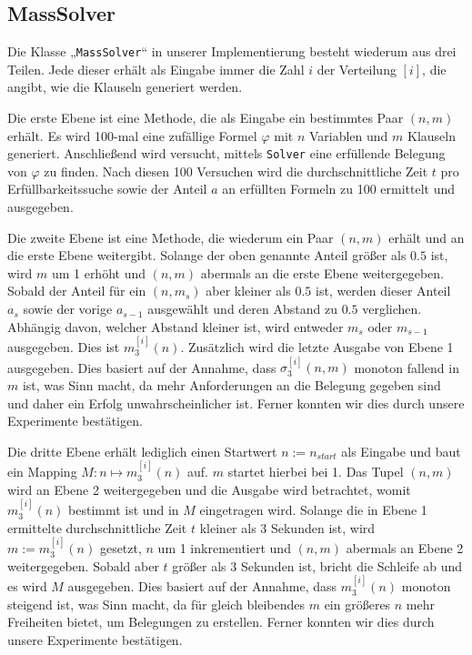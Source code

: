 \documentclass[maincolor=black]{exercise}
\newcommand{\anf}[1]{„#1“}
\begin{document}
\subsection{MassSolver}
Die Klasse \anf{\texttt{MassSolver}} in unserer Implementierung besteht wiederum aus drei Teilen. Jede dieser erhält als Eingabe immer die Zahl $i$ der Verteilung $[i]$, die angibt, wie die Klauseln generiert werden.\par
Die erste Ebene ist eine Methode, die als Eingabe ein bestimmtes Paar $(n,m)$ erhält. Es wird 100-mal eine zufällige Formel $\varphi$ mit $n$ Variablen und $m$ Klauseln generiert. Anschließend wird versucht, mittels \texttt{Solver} eine erfüllende Belegung von $\varphi$ zu finden. Nach diesen 100 Versuchen wird die durchschnittliche Zeit $t$ pro Erfüllbarkeitssuche sowie der Anteil $a$ an erfüllten Formeln zu 100 ermittelt und ausgegeben.\par
Die zweite Ebene ist eine Methode, die wiederum ein Paar $(n,m)$ erhält und an die erste Ebene weitergibt. Solange der oben genannte Anteil größer als $0.5$ ist, wird $m$ um 1 erhöht und $(n,m)$ abermals an die erste Ebene weitergegeben. Sobald der Anteil für ein $(n,m_s)$ aber kleiner als $0.5$ ist, werden dieser Anteil $a_s$ sowie der vorige $a_{s-1}$ ausgewählt und deren Abstand zu $0.5$ verglichen. Abhängig davon, welcher Abstand kleiner ist, wird entweder $m_s$ oder $m_{s-1}$ ausgegeben. Dies ist $m_3^{[i]}(n)$. Zusätzlich wird die letzte Ausgabe von Ebene 1 ausgegeben. Dies basiert auf der Annahme, dass $\sigma_3^{[i]}(n,m)$ monoton fallend in $m$ ist, was Sinn macht, da mehr Anforderungen an die Belegung gegeben sind und daher ein Erfolg unwahrscheinlicher ist. Ferner konnten wir dies durch unsere Experimente bestätigen.\par
Die dritte Ebene erhält lediglich einen Startwert $n := n_{start}$ als Eingabe und baut ein Mapping $M: n \mapsto m_3^{[i]}(n)$ auf. $m$ startet hierbei bei 1. Das Tupel $(n,m)$ wird an Ebene 2 weitergegeben und die Ausgabe wird betrachtet, womit $m_3^{[i]}(n)$ bestimmt ist und in $M$ eingetragen wird. Solange die in Ebene 1 ermittelte durchschnittliche Zeit $t$ kleiner als 3 Sekunden ist, wird $m := m_3^{[i]}(n)$ gesetzt, $n$ um 1 inkrementiert und $(n,m)$ abermals an Ebene 2 weitergegeben. Sobald aber $t$ größer als 3 Sekunden ist, bricht die Schleife ab und es wird $M$ ausgegeben. Dies basiert auf der Annahme, dass $m_3^{[i]}(n)$ monoton steigend ist, was Sinn macht, da für gleich bleibendes $m$ ein größeres $n$ mehr Freiheiten bietet, um Belegungen zu erstellen. Ferner konnten wir dies durch unsere Experimente bestätigen.\par
\end{document}

